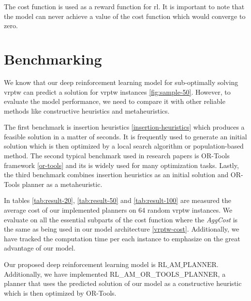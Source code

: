 The cost function is used as a reward function for \gls{rl}. It is important to note that the model can never achieve a value of the cost function which would converge to zero.
\newline

\section{Benchmarking}\label{benchmarking}
We know that our deep reinforcement learning model for sub-optimally solving \gls{vrptw} can predict a solution for \gls{vrptw} instances \ref{fig:sample-50}. However, to evaluate the model performance, we need to compare it with other reliable methods like constructive heuristics and metaheuristics.

The first benchmark is insertion heuristics \ref{insertion-heuristics} which produces a feasible solution in a matter of seconds. It is frequently used to generate an initial solution which is then optimized by a local search algorithm or population-based method. The second typical benchmark used in research papers is OR-Tools framework \ref{or-tools} and its is widely used for many optimization tasks. Lastly, the third benchmark combines insertion heuristics as an initial solution and OR-Tools planner as a metaheuristic.

In tables \ref{tab:result-20}, \ref{tab:result-50} and \ref{tab:result-100} are measured the average cost of our implemented planners on 64 random \gls{vrptw} instances. We evaluate on all the essential subparts of the cost function where the \textit{AggCost} is the same as being used in our model architecture \ref{vrptw-cost}. Additionally, we have tracked the computation time per each instance to emphasize on the great advantage of our model.

Our proposed deep reinforcement learning model is $\text{RL\_AM\_PLANNER}$. Additionally, we have implemented RL\_AM\_OR\_TOOLS\_PLANNER, a planner that uses the predicted solution of our model as a constructive heuristic which is then optimized by OR-Tools.

